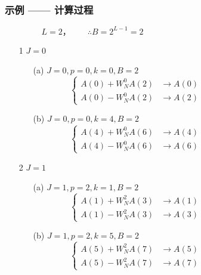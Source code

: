 \documentclass[notheorems,compress,mathserif,table]{beamer}
\begin{document}
\begin{frame}[allowframebreaks]\frametitle{示例 —— 计算过程}%
$$L=2，\quad\quad\therefore B=2^{L-1}=2\quad\quad\quad\quad\quad\quad\quad\quad\quad\quad\quad\quad\quad\quad\quad$$

\begin{enumerate}
  \item [1] $J=0$
      \begin{enumerate}
      \item [(a)] $J=0,p=0,k=0,B=2$
                $$
                    \left\{ \begin{aligned}
                    A(0) + W_N^{0}A(2) &\longrightarrow A(0)\quad\quad\quad\quad\quad\quad\quad\quad \\
                    A(0) - W_N^{0}A(2) &\longrightarrow A(2)
                    \end{aligned} \right.
                $$
      \item [(b)] $J=0,p=0,k=4,B=2$
                $$
                    \left\{ \begin{aligned}
                    A(4) + W_N^{0}A(6) &\longrightarrow A(4)\quad\quad\quad\quad\quad\quad\quad\quad \\
                    A(4) - W_N^{0}A(6) &\longrightarrow A(6)
                    \end{aligned} \right.
                $$
      \end{enumerate}
      \newpage
  \item [2] $J=1$
      \begin{enumerate}
      \item [(a)]$J=1,p=2,k=1,B=2$
                $$
                    \left\{ \begin{aligned}
                    A(1) + W_N^{2}A(3) &\longrightarrow A(1)\quad\quad\quad\quad\quad\quad\quad\quad \\
                    A(1) - W_N^{2}A(3) &\longrightarrow A(3)
                    \end{aligned} \right.
                $$
      \item [(b)]$J=1,p=2,k=5,B=2$
                $$
                    \left\{ \begin{aligned}
                    A(5) + W_N^{2}A(7) &\longrightarrow A(5)\quad\quad\quad\quad\quad\quad\quad\quad \\
                    A(5) - W_N^{2}A(7) &\longrightarrow A(7)
                    \end{aligned} \right.
                $$
      \end{enumerate}
\end{enumerate}
\end{frame}
\end{document}
